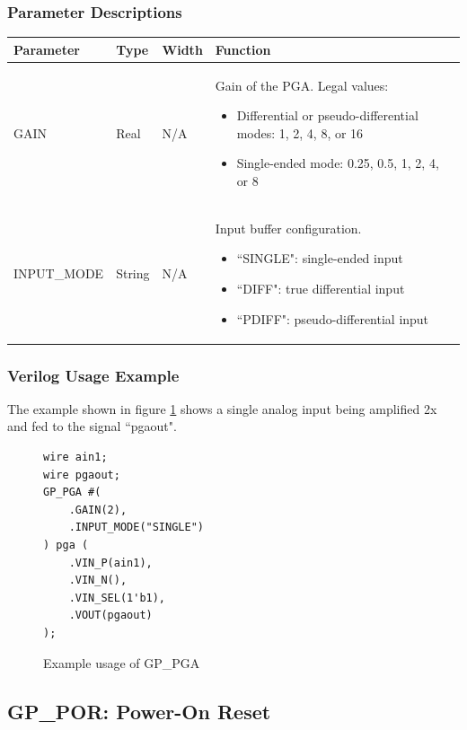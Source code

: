 \documentclass[11pt]{article}
\begin{document}
\subsubsection{Parameter Descriptions}

\begin{tabularx}{5in}{|l|l|l|X|}
\hline
{\bfseries Parameter} & {\bfseries Type} & {\bfseries Width} & {\bfseries Function} \\
\hline
GAIN & Real & N/A &
	Gain of the PGA. Legal values: 
	
	\begin{itemize}
		\item Differential or pseudo-differential modes: 1, 2, 4, 8, or 16
		\item Single-ended mode: 0.25, 0.5, 1, 2, 4, or 8
	\end{itemize}\\
	
\hline
INPUT\_MODE & String & N/A &
	Input buffer configuration.
	\begin{itemize}
		\item ``SINGLE": single-ended input
		\item ``DIFF": true differential input
		\item ``PDIFF": pseudo-differential input
	\end{itemize}\\
\hline
\end{tabularx}

\pagebreak
\subsubsection{Verilog Usage Example}

The example shown in figure \ref{gp-pga-example} shows a single analog input being amplified 2x and fed to the signal 
``pgaout".

\begin{figure}[h]
\begin{lstlisting}
wire ain1;
wire pgaout;
GP_PGA #(
	.GAIN(2),
	.INPUT_MODE("SINGLE")
) pga (
	.VIN_P(ain1),
	.VIN_N(),
	.VIN_SEL(1'b1),
	.VOUT(pgaout)
);
\end{lstlisting}
\caption{Example usage of GP\_PGA}
\label{gp-pga-example}
\end{figure}


\pagebreak
\clearpage
\subsection{GP\_POR: Power-On Reset}
\end{document}
